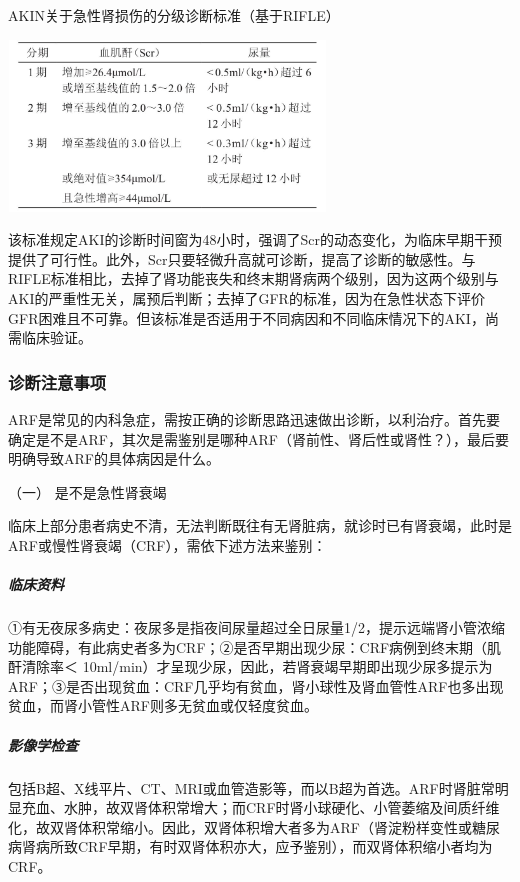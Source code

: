 \begin{table}[htbp]
\centering
\caption{AKIN关于急性肾损伤的分级诊断标准（基于RIFLE）}
\label{tab31-2}
\includegraphics[width=3.32292in,height=1.79167in]{./images/Image00119.jpg}
\end{table}

该标准规定AKI的诊断时间窗为48小时，强调了Scr的动态变化，为临床早期干预提供了可行性。此外，Scr只要轻微升高就可诊断，提高了诊断的敏感性。与RIFLE标准相比，去掉了肾功能丧失和终末期肾病两个级别，因为这两个级别与AKI的严重性无关，属预后判断；去掉了GFR的标准，因为在急性状态下评价GFR困难且不可靠。但该标准是否适用于不同病因和不同临床情况下的AKI，尚需临床验证。

\subsubsection{诊断注意事项}

ARF是常见的内科急症，需按正确的诊断思路迅速做出诊断，以利治疗。首先要确定是不是ARF，其次是需鉴别是哪种ARF（肾前性、肾后性或肾性？），最后要明确导致ARF的具体病因是什么。

\hypertarget{text00083.htmlux5cux23CHP3-7-5-5-1}{}
（一） 是不是急性肾衰竭

临床上部分患者病史不清，无法判断既往有无肾脏病，就诊时已有肾衰竭，此时是ARF或慢性肾衰竭（CRF），需依下述方法来鉴别：

\subparagraph{临床资料}

①有无夜尿多病史：夜尿多是指夜间尿量超过全日尿量1/2，提示远端肾小管浓缩功能障碍，有此病史者多为CRF；②是否早期出现少尿：CRF病例到终末期（肌酐清除率＜
10ml/min）才呈现少尿，因此，若肾衰竭早期即出现少尿多提示为ARF；③是否出现贫血：CRF几乎均有贫血，肾小球性及肾血管性ARF也多出现贫血，而肾小管性ARF则多无贫血或仅轻度贫血。

\subparagraph{影像学检查}

包括B超、X线平片、CT、MRI或血管造影等，而以B超为首选。ARF时肾脏常明显充血、水肿，故双肾体积常增大；而CRF时肾小球硬化、小管萎缩及间质纤维化，故双肾体积常缩小。因此，双肾体积增大者多为ARF（肾淀粉样变性或糖尿病肾病所致CRF早期，有时双肾体积亦大，应予鉴别），而双肾体积缩小者均为CRF。

